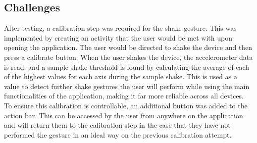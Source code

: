 \documentclass{l4proj}
\begin{document}
\subsection{Challenges}
After testing, a calibration step was required for the shake gesture. This was implemented by creating an activity that the user would be met with upon opening the application. The user would be directed to shake the device and then press a calibrate button. When the user shakes the device, the accelerometer data is read, and a sample shake threshold is found by calculating the average of each of the highest values for each axis during the sample shake. This is used as a value to detect further shake gestures the user will perform while using the main functionalities of the application, making it far more reliable across all devices. To ensure this calibration is controllable, an additional button was added to the action bar. This can be accessed by the user from anywhere on the application and will return them to the calibration step in the case that they have not performed the gesture in an ideal way on the previous calibration attempt.






\end{document}
